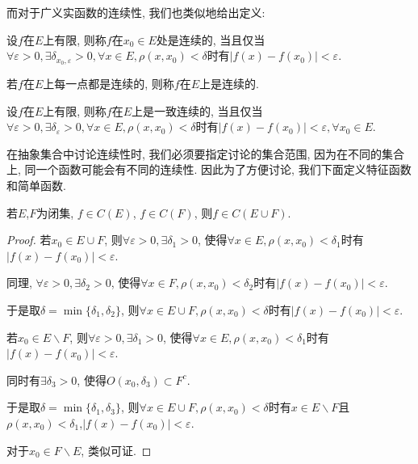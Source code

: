\documentclass[theorem=false,mathfont=none,openany,sub3section]{easybook}
\begin{document}
而对于广义实函数的连续性, 我们也类似地给出定义:\par

\begin{definition}
  设$f$在$E$上有限, 则称$f$在$x_0\in E$处是连续的, 当且仅当$ \forall \varepsilon >0, \exists \delta_{x_0,\varepsilon} >0, \forall x\in E, \rho(x,x_0)<\delta$时有$ |f(x)-f(x_0)|<\varepsilon$.\par
  若$f$在$E$上每一点都是连续的, 则称$f$在$E$上是连续的.\par
  设$f$在$E$上有限, 则称$f$在$E$上是一致连续的, 当且仅当$ \forall \varepsilon >0, \exists \delta_{\varepsilon} >0, \forall x\in E, \rho(x,x_0)<\delta$时有$ |f(x)-f(x_0)|<\varepsilon, \forall x_0 \in E$.\par
\end{definition}

\begin{remark}
  在抽象集合中讨论连续性时, 我们必须要指定讨论的集合范围, 因为在不同的集合上, 同一个函数可能会有不同的连续性. 因此为了方便讨论, 我们下面定义特征函数和简单函数.\par
\end{remark}

\begin{theorem}
  若$E$,$F$为闭集, $f\in C(E)$, $f\in C(F)$, 则$f\in C(E \cup F)$.\par
\end{theorem}

\begin{proof}
  若$x_0\in E\cup F$, 则$\forall \varepsilon >0, \exists \delta_{1} >0$, 使得$\forall x\in E, \rho(x,x_0)<\delta_{1}$时有$|f(x)-f(x_0)|<\varepsilon$.\par
  同理, $\forall \varepsilon >0, \exists \delta_{2} >0$, 使得$\forall x\in F, \rho(x,x_0)<\delta_{2}$时有$|f(x)-f(x_0)|<\varepsilon$.\par
  于是取$\delta = \min\{\delta_{1},\delta_{2}\}$, 则$\forall x\in E\cup F, \rho(x,x_0)<\delta$时有$|f(x)-f(x_0)|<\varepsilon$.\par
  若$x_0\in E\backslash F$, 则$\forall \varepsilon >0, \exists \delta_{1} >0$, 使得$\forall x\in E, \rho(x,x_0)<\delta_{1}$时有$|f(x)-f(x_0)|<\varepsilon$.\par
  同时有$\exists \delta_{3} >0$, 使得$O(x_0,\delta_{3})\subset F^c$.\par
  于是取$\delta = \min\{\delta_{1},\delta_{3}\}$, 则$\forall x\in E\cup F, \rho(x,x_0)<\delta$时有$x\in E\backslash F$且$\rho(x,x_0)<\delta_{1}$,$|f(x)-f(x_0)|<\varepsilon$.\par
  对于$x_0\in F\backslash E$, 类似可证.\par
\end{proof}
\end{document}
